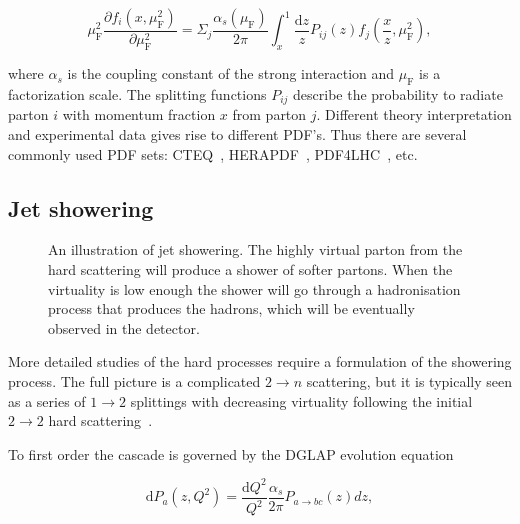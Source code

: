 \begin{equation}
\mu_\mathrm{F}^2 \frac{\partial f_i\left(x,\mu_{\mathrm{F}}^2 \right)}{\partial \mu_{\mathrm{F}}^2} = \Sigma_j \frac{\alpha_s\left(\mu_{\mathrm{F}}\right)}{2{\pi}} \int _x^1 \frac{\mathrm{d}z}{z} P_{ij}(z) f_j\left(\frac{x}{z},\mu_{\mathrm{F}}^2\right),
\label{eq:dglap}
\end{equation}



\noindent where $\alpha_s$ is the coupling constant of the strong interaction and $\mu_{\mathrm{F}}$ is a factorization scale. The splitting functions $P_{ij}$ describe the probability to radiate parton $i$ with momentum fraction $x$ from parton $j$. Different theory interpretation and experimental data gives rise to different PDF's. Thus there are several commonly used PDF sets: CTEQ~\cite{cteq}, HERAPDF~\cite{CooperSarkar:2011aa}, PDF4LHC~\cite{Butterworth:2015oua}, etc. %

\subsection{Jet showering}
\label{sec:shower}
\begin{figure}
\centering

\caption[Jet showering]{An illustration of jet showering. The highly virtual parton from the hard scattering will produce a shower of softer partons. When the virtuality is low enough the shower will go through a hadronisation process that produces the hadrons, which will be eventually observed in the detector. }
\label{fig:showering}
\end{figure}

More detailed studies of the hard processes require a formulation of the showering process. The full picture is a complicated $2\rightarrow n$ scattering, but it is typically seen as a series of $1\rightarrow2$ splittings with decreasing virtuality following the initial $2\rightarrow 2$ hard scattering~\cite{newPythiaShower}.

To first order the cascade is governed by the DGLAP evolution equation~\cite{Gribov:1972ri,Altarelli:1977zs,Dokshitzer:1977sg}

\begin{equation}
\mathrm{d} P_a\left(z,Q^2\right) = \frac{\mathrm{d}Q^2}{Q^2}\frac{\alpha_s}{2\pi} P_{a\rightarrow bc}\left(z\right)dz,
\label{eq:dglap}
\end{equation} 


